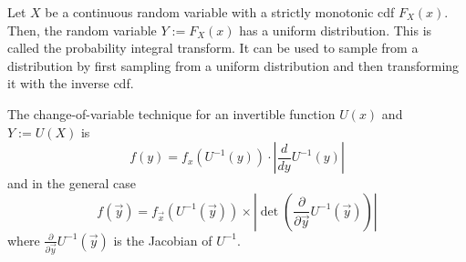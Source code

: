 Let $X$ be a continuous random variable with a strictly monotonic cdf
$F_X(x)$. Then, the random variable $Y := F_X(x)$ has a uniform distribution.
This is called the probability integral transform.
It can be used to sample from a distribution by first sampling from
a uniform distribution and then transforming it with the inverse cdf.

The change-of-variable technique for an invertible function $U(x)$
and $Y := U(X)$ is
\begin{equation*}
    f(y) = f_x(U^{-1}(y)) \cdot \left| \frac{d}{dy}U^{-1}(y) \right|
\end{equation*}
and in the general case
\begin{equation*}
    f(\vec{y}) = f_{\vec{x}} (U^{-1}(\vec{y})) \times
    \left| \det\left( \frac{\partial}{\partial \vec{y}}
    U^{-1}(\vec{y}) \right) \right|
\end{equation*}
where $\frac{\partial}{\partial \vec{y}}U^{-1}(\vec{y})$
is the Jacobian of $U^{-1}$.
